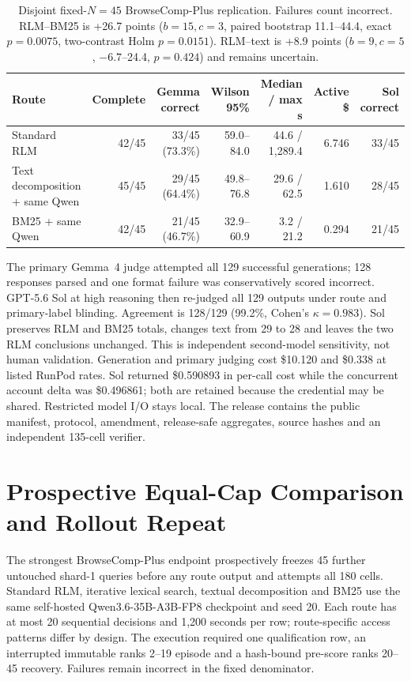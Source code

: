 \documentclass[letterpaper]{article}
\begin{document}
\begin{table}[!t]
\centering
\small
\setlength{\tabcolsep}{3pt}
\begin{tabular}{@{}lrrrrrr@{}}
\toprule
\textbf{Route} & \textbf{Complete} & \textbf{Gemma correct} & \textbf{Wilson 95\%} & \textbf{Median / max s} & \textbf{Active \$} & \textbf{Sol correct} \\
\midrule
Standard RLM & 42/45 & 33/45 (73.3\%) & 59.0--84.0 & 44.6 / 1,289.4 & 6.746 & 33/45 \\
Text decomposition + same Qwen & 45/45 & 29/45 (64.4\%) & 49.8--76.8 & 29.6 / 62.5 & 1.610 & 28/45 \\
BM25 + same Qwen & 42/45 & 21/45 (46.7\%) & 32.9--60.9 & 3.2 / 21.2 & 0.294 & 21/45 \\
\bottomrule
\end{tabular}
\caption{Disjoint fixed-$N{=}45$ BrowseComp-Plus replication. Failures count
incorrect. RLM--BM25 is +26.7 points ($b{=}15,c{=}3$, paired bootstrap
11.1--44.4, exact $p{=}0.0075$, two-contrast Holm $p{=}0.0151$).
RLM--text is +8.9 points ($b{=}9,c{=}5$, $-6.7$--24.4,
$p{=}0.424$) and remains uncertain.}
\label{tab:supp-browsecomp-fixed-n45}
\end{table}

The primary Gemma~4 judge attempted all 129 successful generations; 128
responses parsed and one format failure was conservatively scored incorrect.
GPT-5.6 Sol at high reasoning then re-judged all 129 outputs under route and
primary-label blinding. Agreement is 128/129 (99.2\%, Cohen's
$\kappa{=}0.983$). Sol preserves RLM and BM25 totals, changes text from 29 to
28 and leaves the two RLM conclusions unchanged. This is independent
second-model sensitivity, not human validation. Generation and primary
judging cost \$10.120 and \$0.338 at listed RunPod rates. Sol returned
\$0.590893 in per-call cost while the concurrent account delta was \$0.496861;
both are retained because the credential may be shared. Restricted model I/O
stays local. The release contains the public manifest, protocol, amendment,
release-safe aggregates, source hashes and an independent 135-cell verifier.

\section{Prospective Equal-Cap Comparison and Rollout Repeat}

The strongest BrowseComp-Plus endpoint prospectively freezes 45 further
untouched shard-1 queries before any route output and attempts all 180 cells.
Standard RLM, iterative lexical search, textual decomposition and BM25 use the
same self-hosted Qwen3.6-35B-A3B-FP8 checkpoint and seed 20. Each route has at
most 20 sequential decisions and 1,200 seconds per row; route-specific access
patterns differ by design. The execution required one qualification row, an
interrupted immutable ranks 2--19 episode and a hash-bound pre-score ranks
20--45 recovery. Failures remain incorrect in the fixed denominator.
\end{document}
